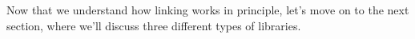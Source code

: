 Now that we understand how linking works in principle, let’s move on to the next section, where we’ll discuss three different types of libraries.
























































